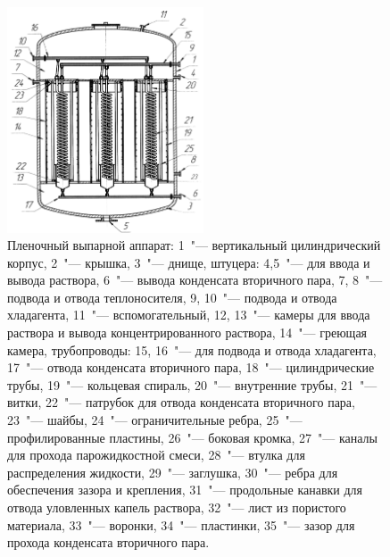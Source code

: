 \begin{figure}[htb]
\centering
\includegraphics[width=0.52\textwidth]{figures/temp/voynov.jpg}
\caption[Пленочный выпарной аппарат]{Пленочный выпарной аппарат: 1~"--- вертикальный цилиндрический корпус, 2~"--- крышка, 3~"--- днище, штуцера: 4,5~"---  для ввода и вывода раствора, 6~"--- вывода конденсата вторичного пара, 7, 8~"--- подвода и отвода теплоносителя, 9, 10~"--- подвода и отвода хладагента, 11~"--- вспомогательный, 12, 13~"--- камеры для ввода раствора и вывода концентрированного раствора, 14~"--- греющая камера, трубопроводы: 15, 16~"--- для подвода и отвода хладагента, 17~"--- отвода конденсата вторичного пара, 18~"--- цилиндрические трубы, 19~"--- кольцевая спираль, 20~"--- внутренние трубы, 21~"--- витки, 22~"--- патрубок для отвода конденсата вторичного пара, 23~"--- шайбы, 24~"--- ограничительные ребра, 25~"--- профилированные пластины, 26~"--- боковая кромка, 27~"--- каналы для прохода парожидкостной смеси, 28~"--- втулка для распределения жидкости, 29~"--- заглушка, 30~"--- ребра для обеспечения зазора и крепления, 31~"--- продольные канавки для отвода уловленных капель раствора, 32~"--- лист из пористого материала, 33~"--- воронки, 34~"--- пластинки, 35~"--- зазор для прохода конденсата вторичного пара.}\label{fig:evaporation_app_voynov}
\end{figure}

